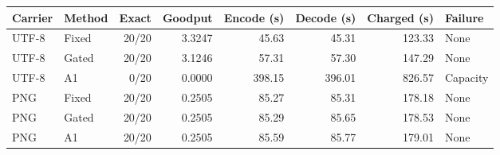 \begin{tabular}{@{}llrrrrrl@{}}
\toprule
Carrier & Method & Exact & Goodput & Encode (s) & Decode (s) & Charged (s) & Failure \\
\midrule
UTF-8 & Fixed & 20/20 & 3.3247 & 45.63 & 45.31 & 123.33 & None \\
UTF-8 & Gated & 20/20 & 3.1246 & 57.31 & 57.30 & 147.29 & None \\
UTF-8 & A1 & 0/20 & 0.0000 & 398.15 & 396.01 & 826.57 & Capacity \\
PNG & Fixed & 20/20 & 0.2505 & 85.27 & 85.31 & 178.18 & None \\
PNG & Gated & 20/20 & 0.2505 & 85.29 & 85.65 & 178.53 & None \\
PNG & A1 & 20/20 & 0.2505 & 85.59 & 85.77 & 179.01 & None \\
\bottomrule
\end{tabular}
